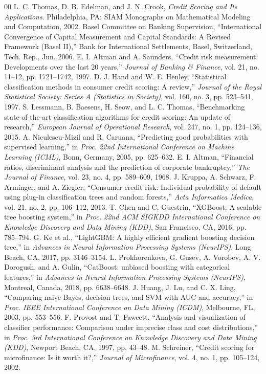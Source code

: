 \documentclass[conference]{IEEEtran}
\begin{document}
\begin{thebibliography}{00}
 L. C. Thomas, D. B. Edelman, and J. N. Crook, \textit{Credit Scoring and Its Applications}. Philadelphia, PA: SIAM Monographs on Mathematical Modeling and Computation, 2002.
 Basel Committee on Banking Supervision, ``International Convergence of Capital Measurement and Capital Standards: A Revised Framework (Basel II),'' Bank for International Settlements, Basel, Switzerland, Tech. Rep., Jun. 2006.
 E. I. Altman and A. Saunders, ``Credit risk measurement: Developments over the last 20 years,'' \textit{Journal of Banking \& Finance}, vol. 21, no. 11--12, pp. 1721--1742, 1997.
 D. J. Hand and W. E. Henley, ``Statistical classification methods in consumer credit scoring: A review,'' \textit{Journal of the Royal Statistical Society: Series A (Statistics in Society)}, vol. 160, no. 3, pp. 523--541, 1997.
 S. Lessmann, B. Baesens, H. Seow, and L. C. Thomas, ``Benchmarking state-of-the-art classification algorithms for credit scoring: An update of research,'' \textit{European Journal of Operational Research}, vol. 247, no. 1, pp. 124--136, 2015.
 A. Niculescu-Mizil and R. Caruana, ``Predicting good probabilities with supervised learning,'' in \textit{Proc. 22nd International Conference on Machine Learning (ICML)}, Bonn, Germany, 2005, pp. 625--632.
 E. I. Altman, ``Financial ratios, discriminant analysis and the prediction of corporate bankruptcy,'' \textit{The Journal of Finance}, vol. 23, no. 4, pp. 589--609, 1968.
 J. Kruppa, A. Schwarz, F. Arminger, and A. Ziegler, ``Consumer credit risk: Individual probability of default using plug-in classification trees and random forests,'' \textit{Acta Informatica Medica}, vol. 21, no. 2, pp. 106--112, 2013.
 T. Chen and C. Guestrin, ``XGBoost: A scalable tree boosting system,'' in \textit{Proc. 22nd ACM SIGKDD International Conference on Knowledge Discovery and Data Mining (KDD)}, San Francisco, CA, 2016, pp. 785--794.
 G. Ke et al., ``LightGBM: A highly efficient gradient boosting decision tree,'' in \textit{Advances in Neural Information Processing Systems (NeurIPS)}, Long Beach, CA, 2017, pp. 3146--3154.
 L. Prokhorenkova, G. Gusev, A. Vorobev, A. V. Dorogush, and A. Gulin, ``CatBoost: unbiased boosting with categorical features,'' in \textit{Advances in Neural Information Processing Systems (NeurIPS)}, Montreal, Canada, 2018, pp. 6638--6648.
 J. Huang, J. Lu, and C. X. Ling, ``Comparing naive Bayes, decision trees, and SVM with AUC and accuracy,'' in \textit{Proc. IEEE International Conference on Data Mining (ICDM)}, Melbourne, FL, 2003, pp. 553--556.
 F. Provost and T. Fawcett, ``Analysis and visualization of classifier performance: Comparison under imprecise class and cost distributions,'' in \textit{Proc. 3rd International Conference on Knowledge Discovery and Data Mining (KDD)}, Newport Beach, CA, 1997, pp. 43--48.
 M. Schreiner, ``Credit scoring for microfinance: Is it worth it?,'' \textit{Journal of Microfinance}, vol. 4, no. 1, pp. 105--124, 2002.
\end{thebibliography}
\end{document}

